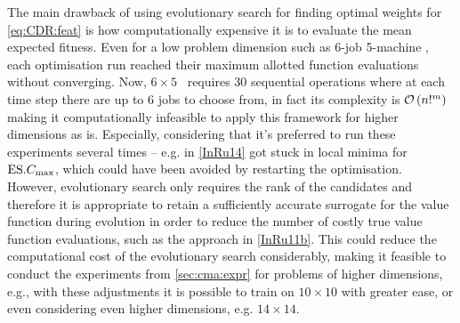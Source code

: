 The main drawback of using evolutionary search for finding optimal weights for 
\cref{eq:CDR:feat} is how computationally expensive it is to evaluate the mean 
expected fitness. Even for a low problem dimension such as 6-job 5-machine 
\JSP, each optimisation run reached their maximum allotted function evaluations 
without converging. 
Now, $6\times5$ \JSP\ requires 30 sequential operations where at each time step 
there are up to $6$ jobs to choose from, in fact its complexity is  
$\mathcal{O}\left(n!^m\right)$ \citep{Giffler60} making it computationally infeasible to apply 
this framework for higher dimensions as is. Especially, considering that it's 
preferred to run these experiments several times -- e.g. in \cref{InRu14} 
 got stuck in local minima for $\text{ES}.{C_{\max}}$, which could have been 
avoided by restarting the optimisation.
However, evolutionary search only requires the rank of the candidates and 
therefore it is appropriate to retain a sufficiently accurate surrogate for the 
value function during evolution in order to reduce the number of costly true 
value function evaluations, such as the approach in \cref{InRu11b}. This could 
reduce the computational cost of the evolutionary search considerably, making 
it feasible to conduct the experiments from \cref{sec:cma:expr} for problems of 
higher dimensions, e.g., with these adjustments it is possible to train on 
$10\times10$ with greater ease, or even considering even higher dimensions, 
e.g. $14\times14$.